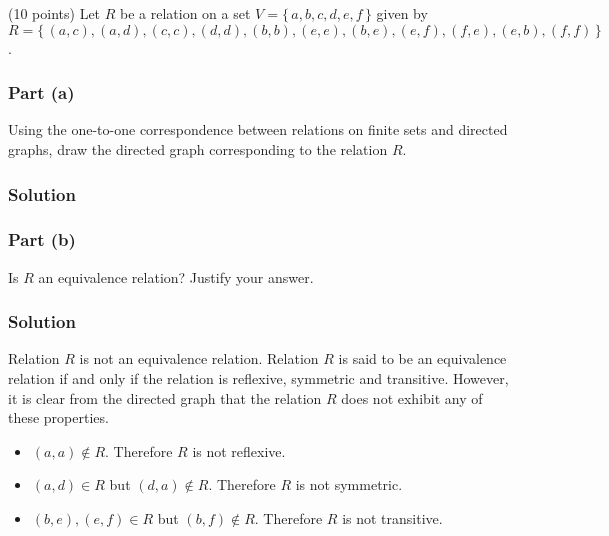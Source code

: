 \documentclass[12pt]{article}
\begin{document}
(10 points) Let $R$ be a relation on a set $V = \{\,a,b,c,d,e,f\,\}$ given by $R = \{\,(a,c),(a,d),(c,c),(d,d),(b,b),(e,e),(b,e),(e,f),(f,e),(e,b),(f,f)\,\}$.

\subsubsection*{Part (a)}

Using the one-to-one correspondence between relations on finite sets and directed graphs, draw the directed graph corresponding to the relation $R$.

\subsubsection*{Solution}


\subsubsection*{Part (b)}

Is $R$ an equivalence relation? Justify your answer.

\subsubsection*{Solution}

Relation $R$ is not an equivalence relation.
Relation $R$ is said to be an equivalence relation if and only if the relation is reflexive, symmetric and transitive.
However, it is clear from the directed graph that the relation $R$ does not exhibit any of these properties.

\begin{itemize}
	\item $(a,a) \notin R$. Therefore $R$ is not reflexive.
	\item $(a,d) \in R$ but $(d,a) \notin R$. Therefore $R$ is not symmetric.
	\item $(b,e),(e,f) \in R$ but $(b,f) \notin R$. Therefore $R$ is not transitive.
\end{itemize}
\end{document}
